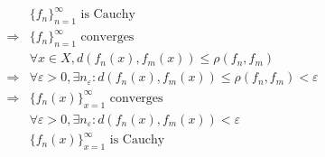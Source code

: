 \documentclass{article}
\begin{document}
~

\begin{align*}
    &\{f_n\}_{n=1}^{\infty}\text{ is Cauchy}\\
    \Rightarrow&\{f_n\}_{n=1}^{\infty}\text{ converges}\\
    &\forall x\in X,d(f_n(x),f_m(x))\leqslant \rho(f_n,f_m)\\
    \Rightarrow&\forall \varepsilon >0,\exists n_\varepsilon:d(f_n(x),f_m(x))\leqslant \rho(f_n,f_m)<\varepsilon\\
    \Rightarrow&\{f_n(x)\}_{x=1}^{\infty}\text{ converges}\\
    &\forall \varepsilon >0,\exists n_\varepsilon:d(f_n(x),f_m(x))<\varepsilon\\
    &\{f_n(x)\}_{x=1}^{\infty}\text{ is Cauchy}\\
\end{align*}
\end{document}
